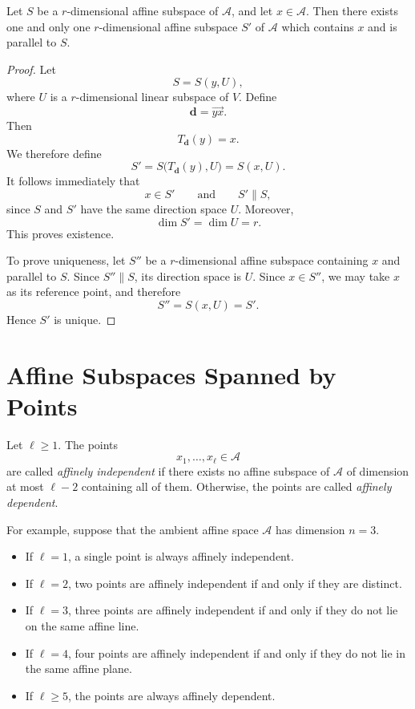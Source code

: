 \documentclass[12pt]{article}
\begin{document}
\begin{proposition}
Let \(S\) be a \(r\)-dimensional affine subspace of \(\mathcal A\), and let
\(x\in \mathcal A\). Then there exists one and only one \(r\)-dimensional
affine subspace \(S'\) of \(\mathcal A\) which contains \(x\) and is parallel
to \(S\).
\end{proposition}

\begin{proof}
Let
\[
S=S(y,U),
\]
where \(U\) is a \(r\)-dimensional linear subspace of \(V\). Define
\[
\mathbf d=\overrightarrow{yx}.
\]
Then
\[
T_{\mathbf d}(y)=x.
\]
We therefore define
\[
S'
   =S\bigl(T_{\mathbf d}(y),U\bigr)
   =S(x,U).
\]
It follows immediately that
\[
x\in S'
\qquad\text{and}\qquad
S'\parallel S,
\]
since \(S\) and \(S'\) have the same direction space \(U\). Moreover,
\[
\dim S'=\dim U=r.
\]
This proves existence.

To prove uniqueness, let \(S''\) be a \(r\)-dimensional affine
subspace containing \(x\) and parallel to \(S\). Since \(S''\parallel
S\), its direction space is \(U\). Since \(x\in S''\), we may take
\(x\) as its reference point, and therefore
\[
S''=S(x,U)=S'.
\]
Hence \(S'\) is unique.
\end{proof}

\section{Affine Subspaces Spanned by Points}

\begin{definition}
Let \(\ell\geq 1\). The points
\[
x_1,\ldots,x_\ell\in \mathcal A
\]
are called \emph{affinely independent} if there exists no affine
subspace of \(\mathcal A\) of dimension at most \(\ell-2\) containing all of them.
Otherwise, the points are called \emph{affinely dependent}.
\end{definition}

For example, suppose that the ambient affine space \(\mathcal A\) has dimension
\(n=3\).

\begin{itemize}
    \item If \(\ell=1\), a single point is always affinely independent.

    \item If \(\ell=2\), two points are affinely independent if and only if
    they are distinct.

    \item If \(\ell=3\), three points are affinely independent if and only if
    they do not lie on the same affine line.

    \item If \(\ell=4\), four points are affinely independent if and only if
    they do not lie in the same affine plane.

    \item If \(\ell\geq 5\), the points are always affinely dependent.
\end{itemize}
\end{document}
